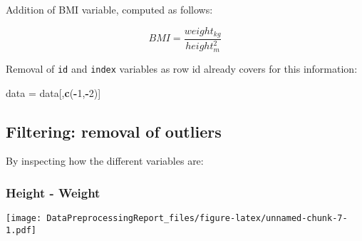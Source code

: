 \documentclass[
]{article}
\newenvironment{Shaded}{\begin{snugshade}}{\end{snugshade}}
\newcommand{\AttributeTok}[1]{\textcolor[rgb]{0.13,0.29,0.53}{#1}}
\newcommand{\DecValTok}[1]{\textcolor[rgb]{0.00,0.00,0.81}{#1}}
\newcommand{\FunctionTok}[1]{\textcolor[rgb]{0.13,0.29,0.53}{\textbf{#1}}}
\newcommand{\NormalTok}[1]{#1}
\newcommand{\OtherTok}[1]{\textcolor[rgb]{0.56,0.35,0.01}{#1}}
\newcommand{\SpecialCharTok}[1]{\textcolor[rgb]{0.81,0.36,0.00}{\textbf{#1}}}
\newcommand{\StringTok}[1]{\textcolor[rgb]{0.31,0.60,0.02}{#1}}
\begin{document}
Addition of BMI variable, computed as follows:

\[BMI = \frac{weight_{kg}}{height_{m}^2}\]

\begin{Shaded}
\end{Shaded}

Removal of \texttt{id} and \texttt{index} variables as row id already
covers for this information:

\begin{Shaded}
\begin{Highlighting}[]
\NormalTok{data }\OtherTok{=}\NormalTok{ data[,}\FunctionTok{c}\NormalTok{(}\SpecialCharTok{{-}}\DecValTok{1}\NormalTok{,}\SpecialCharTok{{-}}\DecValTok{2}\NormalTok{)] }
\end{Highlighting}
\end{Shaded}

\hypertarget{filtering-removal-of-outliers}{%
\subsection{Filtering: removal of
outliers}\label{filtering-removal-of-outliers}}

By inspecting how the different variables are:

\hypertarget{height---weight}{%
\subsubsection{Height - Weight}\label{height---weight}}

\begin{Shaded}
\end{Shaded}

\texttt{[image: DataPreprocessingReport\_files/figure-latex/unnamed-chunk-7-1.pdf]}

\begin{Shaded}
\end{Shaded}
\end{document}
